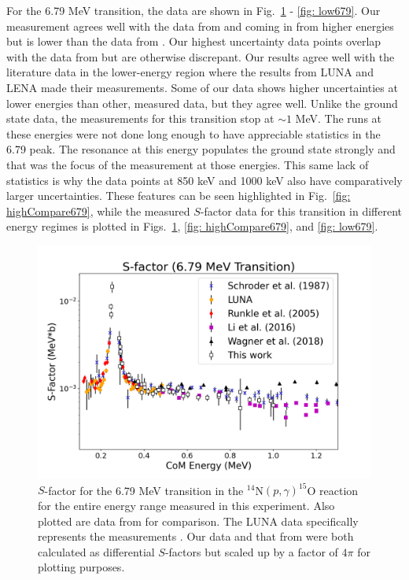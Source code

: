 For the 6.79 MeV transition, the data are shown in Fig.~\ref{fig: full679} - \ref{fig: low679}. Our measurement agrees well with the data from \citet{Schroder1987} and \citet{Li2016} coming in from higher energies but is lower than the data from \citet{Wagner2018}. Our highest uncertainty data points overlap with the data from \citet{Wagner2018} but are otherwise discrepant. Our results agree well with the literature data in the lower-energy region where the results from LUNA \cite{Formicola2004, Imbriani2005, Marta2008, Marta2011} and LENA \cite{Runkle2005} made their measurements. Some of our data shows higher uncertainties at lower energies than other, measured data, but they agree well. Unlike the ground state data, the measurements for this transition stop at $\sim 1$ MeV. The runs at these energies were not done long enough to have appreciable statistics in the 6.79 peak. The resonance at this energy populates the ground state strongly and that was the focus of the measurement at those energies. This same lack of statistics is why the data points at 850 keV and 1000 keV also have comparatively larger uncertainties. These features can be seen highlighted in Fig.\ \ref{fig: highCompare679}, while the measured $S$-factor data for this transition in different energy regimes is plotted in Figs.\ \ref{fig: full679}, \ref{fig: highCompare679}, and \ref{fig: low679}.


\begin{figure}
		\includegraphics[width=1.0\linewidth]{figures/full679.png}
	\caption{$S$-factor for the 6.79 MeV transition in the $^{14}$N$\left( p,\gamma \right) ^{15}$O reaction for the entire energy range measured in this experiment. Also plotted are data from \cite{Schroder1987, Formicola2004, Imbriani2005, Runkle2005, Marta2008, Marta2011, Li2016, Wagner2018} for comparison. The LUNA data specifically represents the measurements \cite{Formicola2004, Imbriani2005, Marta2008, Marta2011}. Our data and that from \citet{Li2016} were both calculated as differential $S$-factors but scaled up by a factor of $4\pi$ for plotting purposes.  }
	\label{fig: full679}
\end{figure}

